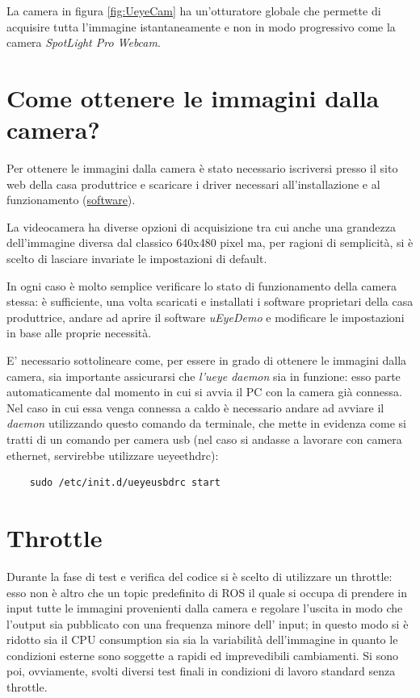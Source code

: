 La camera in figura \ref{fig:UeyeCam} ha un'otturatore globale che permette di acquisire tutta l'immagine istantaneamente e non in modo progressivo come la camera  \textit{SpotLight Pro Webcam}.

\section{Come ottenere le immagini dalla camera?}
Per ottenere le immagini dalla camera è stato necessario iscriversi presso il sito web della casa produttrice e scaricare i driver necessari all'installazione e al funzionamento (\href{https://en.ids-imaging.com/manuals-ueye-software.html}{software}).

La videocamera ha diverse opzioni di acquisizione tra cui anche una grandezza dell'immagine diversa dal classico 640x480 pixel ma, per ragioni di semplicità, si è scelto di lasciare invariate le impostazioni di default.

In ogni caso è molto semplice verificare lo stato di funzionamento della camera stessa: è sufficiente, una volta scaricati e installati i software proprietari della casa produttrice, andare ad aprire il software \textit{uEyeDemo} e modificare le impostazioni in base alle proprie necessità.

E' necessario sottolineare come, per essere in grado di ottenere le immagini dalla camera, sia importante assicurarsi che \textit{l'ueye daemon} sia in funzione: esso parte automaticamente dal momento in cui si avvia il PC con la camera già connessa. Nel caso in cui essa venga connessa a caldo è necessario andare ad avviare il \textit{daemon} utilizzando questo comando da terminale, che mette in evidenza come si tratti di un comando per camera usb (nel caso si andasse a lavorare con camera ethernet, servirebbe utilizzare ueyeethdrc):

\begin{lstlisting}
	sudo /etc/init.d/ueyeusbdrc start
\end{lstlisting}
\section{Throttle}
Durante la fase di test e verifica del codice si è scelto di utilizzare un throttle:
esso non è altro che un topic predefinito di ROS il quale si occupa di prendere in input tutte le immagini provenienti dalla camera e regolare l'uscita in modo che l'output sia pubblicato con una frequenza minore dell' input; in questo modo si è ridotto sia il CPU consumption sia sia la variabilità dell'immagine in quanto le condizioni esterne sono soggette a rapidi ed imprevedibili cambiamenti.
Si sono poi, ovviamente, svolti diversi test finali in condizioni di lavoro standard senza throttle.
